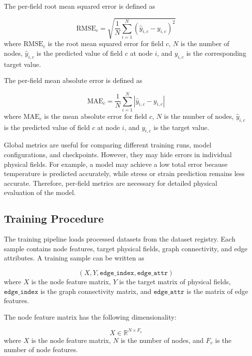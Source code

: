The per-field root mean squared error is defined as

\begin{equation}
\mathrm{RMSE}_c
=
\sqrt{
\frac{1}{N}
\sum_{i=1}^{N}
\left(
\hat{y}_{i,c}
-
y_{i,c}
\right)^2
}
\end{equation}
where \(\mathrm{RMSE}_c\) is the root mean squared error for field \(c\), \(N\) is the number of nodes, \(\hat{y}_{i,c}\) is the predicted value of field \(c\) at node \(i\), and \(y_{i,c}\) is the corresponding target value.

The per-field mean absolute error is defined as

\begin{equation}
\mathrm{MAE}_c
=
\frac{1}{N}
\sum_{i=1}^{N}
\left|
\hat{y}_{i,c}
-
y_{i,c}
\right|
\end{equation}
where \(\mathrm{MAE}_c\) is the mean absolute error for field \(c\), \(N\) is the number of nodes, \(\hat{y}_{i,c}\) is the predicted value of field \(c\) at node \(i\), and \(y_{i,c}\) is the target value.

Global metrics are useful for comparing different training runs, model configurations, and checkpoints. However, they may hide errors in individual physical fields. For example, a model may achieve a low total error because temperature is predicted accurately, while stress or strain prediction remains less accurate. Therefore, per-field metrics are necessary for detailed physical evaluation of the model.

\subsection{Training Procedure}

The training pipeline loads processed datasets from the dataset registry. Each sample contains node features, target physical fields, graph connectivity, and edge attributes. A training sample can be written as

\begin{equation}
\left(
X,
Y,
\texttt{edge\_index},
\texttt{edge\_attr}
\right)
\end{equation}
where \(X\) is the node feature matrix, \(Y\) is the target matrix of physical fields, \(\texttt{edge\_index}\) is the graph connectivity matrix, and \(\texttt{edge\_attr}\) is the matrix of edge features.

The node feature matrix has the following dimensionality:

\begin{equation}
X
\in
\mathbb{R}^{N \times F_v}
\end{equation}
where \(X\) is the node feature matrix, \(N\) is the number of nodes, and \(F_v\) is the number of node features.

